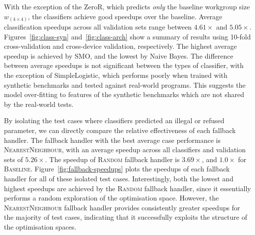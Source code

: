 \documentclass[nonatbib,preprint,10pt]{sigplanconf}
\begin{document}
With the exception of the ZeroR, which predicts \emph{only} the
baseline workgroup size $w_{\left( 4 \times 4 \right)}$, the
classifiers achieve good speedups over the baseline. Average
classification speedups across all validation sets range between
$4.61\times$ and $5.05\times$. Figures~\ref{fig:class-syn}
and~\ref{fig:class-arch} show a summary of results using 10-fold
cross-validation and cross-device validation, respectively.  The
highest average speedup is achieved by SMO, and the lowest by Naive
Bayes. The difference between average speedups is not significant
between the types of classifier, with the exception of SimpleLogistic,
which performs poorly when trained with synthetic benchmarks and
tested against real-world programs. This suggests the model
over-fitting to features of the synthetic benchmarks which are not
shared by the real-world
tests.


By isolating the test cases where classifiers predicted an illegal or
refused parameter, we can directly compare the relative effectiveness
of each fallback handler. The fallback handler with the best average
case performance is \textsc{NearestNeighbour}, with an average speedup
across all classifiers and validation sets of $5.26\times$. The
speedup of \textsc{Random} fallback handler is $3.69\times$, and
$1.0\times$ for \textsc{Baseline}. Figure~\ref{fig:fallback-speedups}
plots the speedups of each fallback handler for all of these isolated
test cases. Interestingly, both the lowest and highest speedups are
achieved by the \textsc{Random} fallback handler, since it essentially
performs a random exploration of the optimisation space. However, the
\textsc{NearestNeighbour} fallback handler provides consistently
greater speedups for the majority of test cases, indicating that it
successfully exploits the structure of the optimisation spaces.
\end{document}
